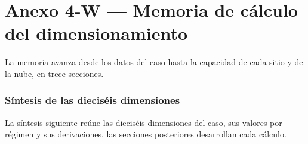 
\chapter*{Anexo 4-W — Memoria de cálculo del dimensionamiento}
\label{fuente-16-anexo-4b-memoria-calculo}
\label{anx:42A}

La memoria avanza desde los datos del caso hasta la capacidad de cada sitio y de la nube, en trece secciones.

\subsection*{Síntesis de las dieciséis dimensiones}
La síntesis siguiente reúne las dieciséis dimensiones del caso, sus valores por régimen y sus derivaciones, las secciones posteriores desarrollan cada cálculo.

